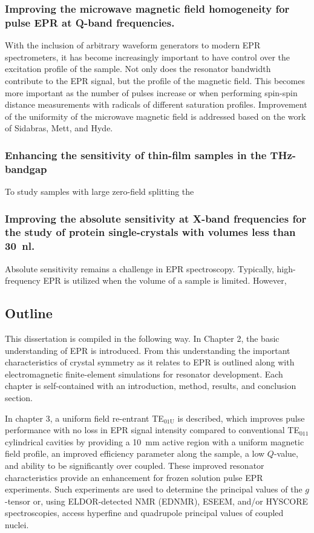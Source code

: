 \subsubsection*{Improving the microwave magnetic field homogeneity for pulse EPR at Q-band frequencies.}
With the inclusion of arbitrary waveform generators to modern EPR spectrometers, it has become increasingly important to have control over the excitation profile of the sample. \cite{DOLL201418,WILI201826} Not only does the resonator bandwidth contribute to the EPR signal,\cite{Tschaggelar2017} but the profile of the magnetic field. This becomes more important as the number of pulses increase \cite{MILIKISYANTS200948,C7CP01488K,C6CP03067J,BREITGOFF2019106560} or when performing spin-spin distance measurements with radicals of different saturation profiles. \cite{C8CP01276H} Improvement of the uniformity of the microwave magnetic field is addressed based on the work of Sidabras, Mett, and Hyde. \cite{HydeUFRev2019}


\subsubsection*{Enhancing the sensitivity of thin-film samples in the THz-bandgap}
To study samples with large zero-field splitting the 

\subsubsection{Improving the absolute sensitivity at X-band frequencies for the study of protein single-crystals with volumes less than 30~nl.}
Absolute sensitivity remains a challenge in EPR spectroscopy. Typically, high-frequency EPR is utilized when the volume of a sample is limited. However,  

\subsection*{Outline}
This dissertation is compiled in the following way. In Chapter 2, the basic understanding of EPR is introduced. From this understanding the important characteristics of crystal symmetry as it relates to EPR is outlined along with electromagnetic finite-element simulations for resonator development. Each chapter is self-contained with an introduction, method, results, and conclusion section. 

In chapter 3, a uniform field re-entrant TE$_{\text{01U}}$ is described, which improves pulse performance with no loss in EPR signal intensity compared to conventional TE$_{011}$ cylindrical cavities by providing a 10~mm active region with a uniform magnetic field profile, an improved efficiency parameter along the sample, a low $Q$-value, and ability to be significantly over coupled. These improved resonator characteristics provide an enhancement for frozen solution pulse EPR experiments. Such experiments are used to determine the principal values of the $g$-tensor or, using ELDOR-detected NMR (EDNMR), ESEEM, and/or HYSCORE spectroscopies, access hyperfine and quadrupole principal values of coupled nuclei.


